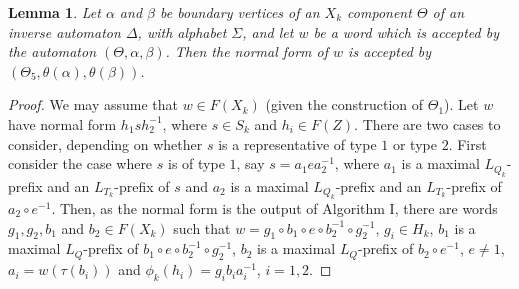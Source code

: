 \documentclass[a4paper,12pt]{article}
\renewcommand{\a}{\alpha }
\renewcommand{\b}{\beta }
\newcommand{\D}{\Delta }
\newcommand{\T}{\Theta }
\renewcommand{\S}{\Sigma }
\renewcommand{\t}{\tau }
\newtheorem{lemma}[theorem]{Lemma}
\numberwithin{equation}{section}
\numberwithin{figure}{section}
\begin{document}
\begin{lemma}
Let $\a$ and $\b$ be boundary vertices of  an $X_k$ component $\T$ of 
an inverse automaton $\D$, with alphabet $\S$, 
and let $w$ be a word
 which is accepted by the automaton $(\T, \a, \b)$. Then the
normal form of $w$ is accepted by $(\T_5, \theta(\a), \theta(\b))$.
\end{lemma}
\begin{proof}
We may assume that $w\in F(X_k)$ (given the construction of $\T_1$).
Let $w$ have normal form $h_1s h_2^{-1}$, where $s\in S_k$ and $h_i\in F(Z)$.
There are two cases to consider, depending on whether $s$ is a
representative of type $1$ or type $2$.
 First consider the case where $s$ is of type $1$, say
 $s= a_1 e a_2^{-1}$, where
$a_1$ is a maximal $L_{Q_k}$-prefix and an $L_{T_k}$-prefix of $s$ and 
 $a_2$  is a maximal $L_{Q_k}$-prefix and an $L_{T_k}$-prefix of $a_2\circ e^{-1}$. 
 Then, as the normal form is the output of Algorithm I, 
 there are words
$g_1, g_2, b_1$ and $b_2\in F(X_k)$ such that
$w=g_1\circ b_1\circ e \circ b_2^{-1}\circ g_2^{-1}$,
$g_i\in H_k$, $b_1$ is a maximal $L_Q$-prefix of 
$b_1\circ e \circ b_2^{-1}\circ g_2^{-1}$, 
$b_2$ is a maximal $L_Q$-prefix of $b_2\circ e^{-1}$, $e\neq 1$,
$a_i=w(\t(b_i))$ and $\phi_k(h_i)=g_ib_ia_i^{-1}$, $i=1,2$.


\end{proof}
\end{document}

